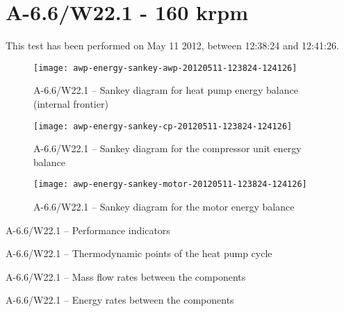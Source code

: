 
\section{A-6.6/W22.1 - 160 krpm}
\label{sec:awp-exp-details-A-6.6/W22.1}

This test has been performed on May 11\th{} 2012, between 12:38:24 and
12:41:26.

\begin{figure}[htbp]
  \centering
  \texttt{[image: awp-energy-sankey-awp-20120511-123824-124126]}
  \caption{A-6.6/W22.1 -- Sankey diagram for heat pump energy balance (internal frontier)}
  \label{fig:awp-A-6.6/W22.1-sankey-energy}
\end{figure}


\begin{figure}[htbp]
  \centering
  \texttt{[image: awp-energy-sankey-cp-20120511-123824-124126]}
  \caption{A-6.6/W22.1 -- Sankey diagram for the compressor unit energy balance}
  \label{fig:awp-A-6.6/W22.1-sankey-cp}
\end{figure}

\begin{figure}[htbp]
  \centering
  \texttt{[image: awp-energy-sankey-motor-20120511-123824-124126]}
  \caption{A-6.6/W22.1 -- Sankey diagram for the motor energy balance}
  \label{fig:awp-A-6.6/W22.1-sankey-motor}
\end{figure}

\begin{table}[htbp]
    \footnotesize
    \begin{center}
    
  \end{center}
  \caption{A-6.6/W22.1 -- Performance indicators}
\end{table}

\begin{table}[htbp]
  \footnotesize
  \begin{center}
    
  \end{center}
  \caption{A-6.6/W22.1 -- Thermodynamic points of the heat pump cycle}
\end{table}


\begin{table}[htbp]
    \footnotesize
    \begin{center}
    
  \end{center}
  \caption{A-6.6/W22.1 -- Mass flow rates between the components}
\end{table}

\begin{table}[htbp]
    \footnotesize
    \begin{center}
    
  \end{center}
  \caption{A-6.6/W22.1 -- Energy rates between the components}
\end{table}

\FloatBarrier
